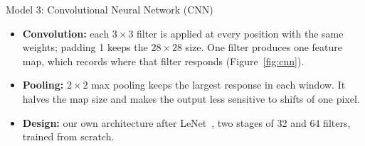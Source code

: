\begin{frame}{Model 3: Convolutional Neural Network (CNN)}
\vspace{-0.3cm}
\small
\begin{itemize}
    \item \textbf{Convolution:} each $3 \times 3$ filter is applied at every position with the same weights; padding 1
          keeps the $28 \times 28$ size. One filter produces one feature map, which records where that filter responds
          (Figure~\ref{fig:cnn}).
    \item \textbf{Pooling:} $2 \times 2$ max pooling keeps the largest response in each window. It halves the map size
          and makes the output less sensitive to shifts of one pixel.
    \item \textbf{Design:} our own architecture after LeNet~\cite{lecun1998gradient}, two stages of 32 and 64 filters,
          trained from scratch.
\end{itemize}
\end{frame}

